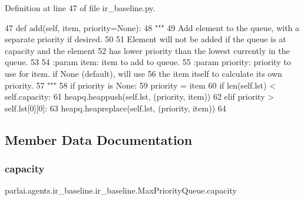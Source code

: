 Definition at line 47 of file ir\+\_\+baseline.\+py.


\begin{DoxyCode}
47     \textcolor{keyword}{def }add(self, item, priority=None):
48         \textcolor{stringliteral}{"""}
49 \textcolor{stringliteral}{        Add element to the queue, with a separate priority if desired.}
50 \textcolor{stringliteral}{}
51 \textcolor{stringliteral}{        Element will not be added if the queue is at capacity and the element}
52 \textcolor{stringliteral}{        has lower priority than the lowest currently in the queue.}
53 \textcolor{stringliteral}{}
54 \textcolor{stringliteral}{        :param item: item to add to queue.}
55 \textcolor{stringliteral}{        :param priority: priority to use for item. if None (default), will use}
56 \textcolor{stringliteral}{                         the item itself to calculate its own priority.}
57 \textcolor{stringliteral}{        """}
58         \textcolor{keywordflow}{if} priority \textcolor{keywordflow}{is} \textcolor{keywordtype}{None}:
59             priority = item
60         \textcolor{keywordflow}{if} len(self.lst) < self.capacity:
61             heapq.heappush(self.lst, (priority, item))
62         \textcolor{keywordflow}{elif} priority > self.lst[0][0]:
63             heapq.heapreplace(self.lst, (priority, item))
64 
\end{DoxyCode}


\subsection{Member Data Documentation}
\mbox{\label{classparlai_1_1agents_1_1ir__baseline_1_1ir__baseline_1_1MaxPriorityQueue_a7d35dfdbd0e65d15b701e1b3275e6d89}} 
\subsubsection{\texorpdfstring{capacity}{capacity}}
{\footnotesize\ttfamily parlai.\+agents.\+ir\+\_\+baseline.\+ir\+\_\+baseline.\+Max\+Priority\+Queue.\+capacity}



